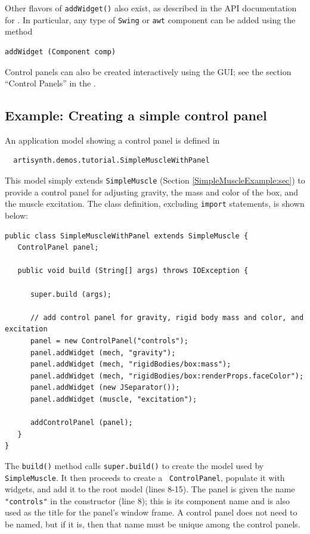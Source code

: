 Other flavors of {\tt addWidget()} also exist, as described in the API
documentation for .  In
particular, any type of {\tt Swing} or {\tt awt} component can be
added using the method
\begin{lstlisting}[]
   addWidget (Component comp)
\end{lstlisting}
%

\begin{sideblock}
Control panels can also be created interactively using the GUI; see
the section ``Control Panels'' in the\pdfbreak
{}.
\end{sideblock}

\subsection{Example: Creating a simple control panel}

An application model showing a control panel is defined in
%
\begin{verbatim}
  artisynth.demos.tutorial.SimpleMuscleWithPanel
\end{verbatim}
%
This model simply extends {\tt SimpleMuscle} (Section
\ref{SimpleMuscleExample:sec}) to provide a control panel for
adjusting gravity, the mass and color of the box, and the muscle
excitation. The class definition, excluding {\tt import} statements,
is shown below:
%
\lstset{numbers=left}
\begin{lstlisting}[]
public class SimpleMuscleWithPanel extends SimpleMuscle {
   ControlPanel panel;

   public void build (String[] args) throws IOException {

      super.build (args);

      // add control panel for gravity, rigid body mass and color, and excitation
      panel = new ControlPanel("controls");
      panel.addWidget (mech, "gravity");
      panel.addWidget (mech, "rigidBodies/box:mass");
      panel.addWidget (mech, "rigidBodies/box:renderProps.faceColor");
      panel.addWidget (new JSeparator());
      panel.addWidget (muscle, "excitation");

      addControlPanel (panel);
   }
}
\end{lstlisting}
\lstset{numbers=none}
%
The {\tt build()} method calls {\tt super.build()} to create the model
used by {\tt SimpleMuscle}. It then proceeds to create a {\tt
ControlPanel}, populate it with widgets, and add
it to the root model (lines 8-15). The panel is given the name {\tt
"controls"} in the constructor (line 8); this is its component name
and is also used as the title for the panel's window frame. A control
panel does not need to be named, but if it is, then that name must be
unique among the control panels.

